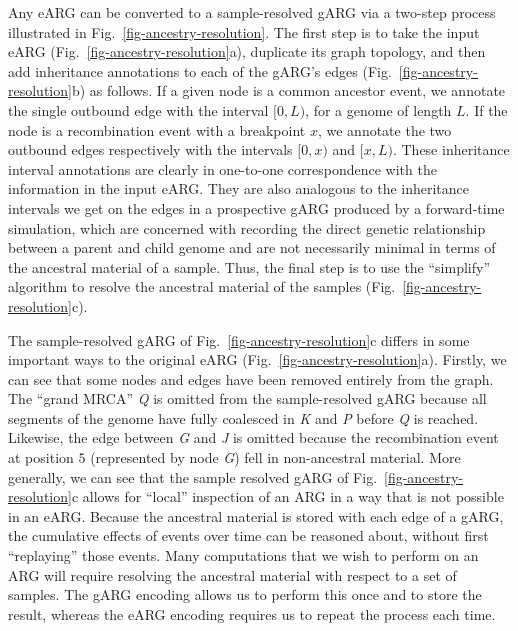 \documentclass[9pt,twocolumn,twoside]{gsajnl}
\newcommand{\noderef}[1]{\textit{#1}}
\begin{document}
Any eARG can be converted to a sample-resolved gARG
via a two-step process illustrated in Fig.~\ref{fig-ancestry-resolution}.
The first step is to take the input eARG (Fig.~\ref{fig-ancestry-resolution}a),
duplicate its graph topology, and then add inheritance annotations
to each of the gARG's edges (Fig.~\ref{fig-ancestry-resolution}b) as follows.
If a given node is a common ancestor event, we annotate the single
outbound edge with the interval $[0,L)$, for a genome of length $L$. If the
node is a recombination event with a breakpoint $x$, we annotate the two
outbound edges respectively with the intervals $[0, x)$ and $[x, L)$. These
inheritance interval annotations are clearly in one-to-one correspondence with
the information in the input eARG. They are also analogous to the
inheritance intervals we get on the edges in a prospective gARG
produced by a forward-time simulation, which are concerned with recording
the direct genetic relationship between a parent and child genome and are not
necessarily minimal in terms of the ancestral material of a sample.
Thus, the final step is to use the ``simplify'' algorithm to resolve the
ancestral material of the samples (Fig.~\ref{fig-ancestry-resolution}c).

The sample-resolved gARG of Fig.~\ref{fig-ancestry-resolution}c
differs in some important ways to the
original eARG (Fig.~\ref{fig-ancestry-resolution}a).
Firstly, we can see that some nodes and edges have been removed entirely
from the graph.
The ``grand MRCA'' \noderef{Q} is omitted from the
sample-resolved gARG because all segments of the genome have
fully coalesced in \noderef{K} and \noderef{P} before \noderef{Q} is reached.
Likewise, the edge
between \noderef{G} and \noderef{J} is omitted because the recombination
event at position $5$ (represented by node \noderef{G})
fell in non-ancestral material.
More generally, we can see that the sample resolved
gARG of Fig.~\ref{fig-ancestry-resolution}c
allows for ``local'' inspection
of an ARG in a way that is not possible in an eARG.
Because the ancestral material is stored with each edge of a gARG, the
cumulative effects of events over time can be reasoned
about, without first ``replaying'' those events.
Many computations
that we wish to perform on an ARG will require resolving
the ancestral material with respect to a set of samples.
The gARG encoding
allows us to perform this once
and to store the result,
whereas the eARG encoding requires us to repeat the process
each time.
\end{document}
